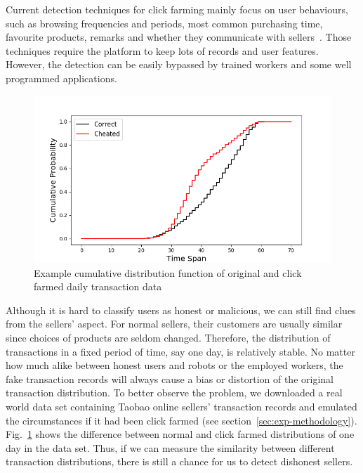 \documentclass[10pt,conference,letterpaper]{article}
\begin{document}
			Current detection techniques for click farming mainly focus on user behaviours, such as browsing frequencies and periods, most common purchasing time, favourite products, remarks and whether they communicate with sellers~\cite{simpleDetection}. Those techniques require the platform to keep lots of records and user features. However, the detection can be easily bypassed by trained workers and some well programmed applications.

			\begin{figure}[t]
				\centering
				\includegraphics[width=\linewidth]{fig/ExampleCDF.png}
				\caption{Example cumulative distribution function of original and click farmed daily transaction data}
				\label{fig:example-ecdf}
			\end{figure}

			Although it is hard to classify users as honest or malicious, we can still find clues from the sellers' aspect. For normal sellers, their customers are usually similar since choices of products are seldom changed. Therefore, the distribution of transactions in a fixed period of time, say one day, is relatively stable. No matter how much alike between honest users and robots or the employed workers, the fake transaction records will always cause a bias or distortion of the original transaction distribution. To better observe the problem, we downloaded a real world data set containing Taobao online sellers' transaction records and emulated the circumstances if it had been click farmed (see section~\ref{sec:exp-methodology}). Fig.~\ref{fig:example-ecdf} shows the difference between normal and click farmed distributions of one day in the data set.
			Thus, if we can measure the similarity between different transaction distributions, there is still a chance for us to detect dishonest sellers.
	
\end{document}
